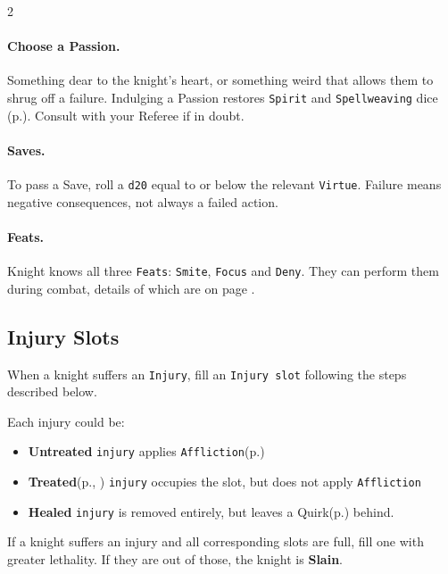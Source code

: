 \begin{multicols*}{2}
\paragraph{Choose a Passion. } Something dear to the knight's heart, or something weird that allows them to shrug off a failure.
Indulging a Passion restores \texttt{Spirit} and \texttt{Spellweaving} dice (p.\pageref*{sec:spellweaving}). Consult with your Referee if in doubt.

\newcolumn

\paragraph{Saves.}

To pass a Save, roll a \texttt{d20} equal to or below the
relevant \texttt{Virtue}. Failure means negative
consequences, not always a failed action.

\paragraph{Feats. } Knight knows all three \texttt{Feats}: \texttt{Smite}, \texttt{Focus} and \texttt{Deny}. 
They can perform them during combat, details of which are on page \pageref*{sec:combat}.

\subsection*{Injury Slots}

When a knight suffers an \texttt{Injury}, fill an \texttt{Injury slot} following the steps described below.

Each injury could be:
\begin{itemize}[nosep, leftmargin=*]
    \item \textbf{Untreated} \texttt{injury} applies \texttt{Affliction}(p.\pageref*{sec:injuries})
    \item \textbf{Treated}(p.\pageref*{sec:combat}, \pageref*{sec:healing}) \texttt{injury} occupies the slot, but does not apply \texttt{Affliction}
    \item \textbf{Healed} \texttt{injury} is removed entirely, but leaves a Quirk(p.\pageref*{sec:quirks}) behind.
\end{itemize}
If a knight suffers an injury and all corresponding slots are full, fill one with greater lethality. If they are out of those, the knight is \textbf{Slain}.


\end{multicols*}
